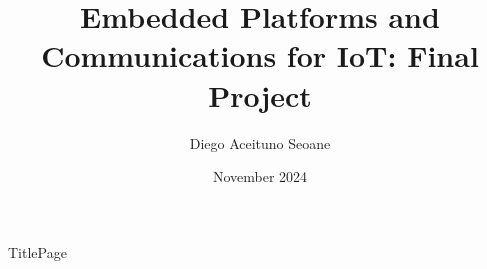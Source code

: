 \documentclass[a4paper,11pt]{article}
\title{Embedded Platforms and Communications for IoT: Final Project}
\author{Diego Aceituno Seoane}
\date{November 2024}
\begin{document}
\begin{titlepage}
    TitlePage
\end{titlepage}
\clearpage
\pagestyle{fancy}
\fancyfoot{}
\fancyhead[EL]{}
\fancyhead[OR]{}
\fancyfoot[EL]{\thepage}
\fancyfoot[OR]{\thepage}
\tableofcontents
\clearpage
\listoffigures
\clearpage
\listoftables
\clearpage

\clearpage

\clearpage

\clearpage

\clearpage

\clearpage

\clearpage

\clearpage


\end{document}
